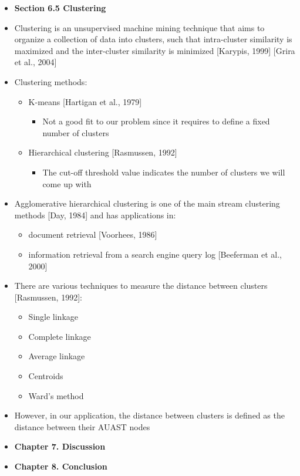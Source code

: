 \documentclass{article}
\newcommand{\bold}{\textbf}
\begin{document}
\begin{itemize} [leftmargin=.1in]
\item \bold{Section 6.5 Clustering}
\item Clustering is an unsupervised machine mining technique that aims to organize a collection of data into clusters, such that intra-cluster similarity is maximized and the inter-cluster similarity is minimized [Karypis, 1999] [Grira et al., 2004]
\item Clustering methods:
\begin{itemize}
\item K-means [Hartigan et al., 1979]
\begin{itemize}
\item Not a good fit to our problem since it requires to define a fixed number of clusters
\end{itemize}
\item Hierarchical clustering [Rasmussen, 1992]
\begin{itemize}
\item The cut-off threshold value indicates the number of clusters we will come up with
\end{itemize}
\end{itemize}
\item Agglomerative hierarchical clustering is one of the main stream clustering methods [Day, 1984] and has applications in:
\begin{itemize}
\item document retrieval [Voorhees, 1986]
\item information retrieval from a search engine query log [Beeferman et al., 2000]
\end{itemize}
\item There are various techniques to measure the distance between clusters [Rasmussen, 1992]:
\begin{itemize}
\item Single linkage
\item Complete linkage
\item Average linkage
\item Centroids
\item Ward's method
\end{itemize}
\item However, in our application, the distance between clusters is defined as the distance between their AUAST nodes

\item \bold{Chapter 7. Discussion}
\item \bold{Chapter 8. Conclusion}
\end{itemize} %
\end{document}
